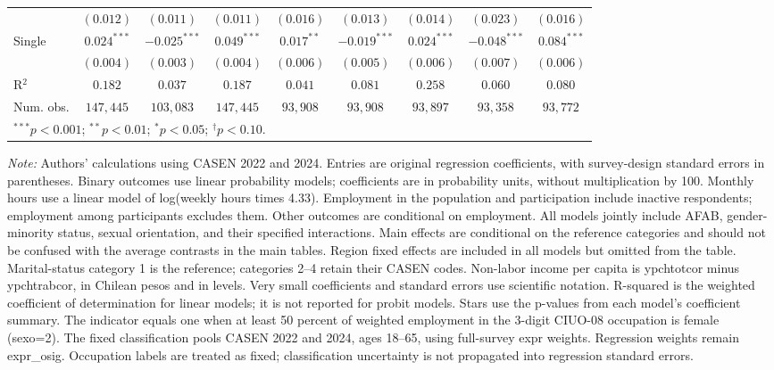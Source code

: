 \begin{table}[htpb]
{\begin{tabular}{l c c c c c c c c}
 & $(0.012)$ & $(0.011)$ & $(0.011)$ & $(0.016)$ & $(0.013)$ & $(0.014)$ & $(0.023)$ & $(0.016)$ \\
Single & $0.024^{***}$ & $-0.025^{***}$ & $0.049^{***}$ & $0.017^{**}$ & $-0.019^{***}$ & $0.024^{***}$ & $-0.048^{***}$ & $0.084^{***}$ \\
 & $(0.004)$ & $(0.003)$ & $(0.004)$ & $(0.006)$ & $(0.005)$ & $(0.006)$ & $(0.007)$ & $(0.006)$ \\
\hline
R$^2$ & $0.182$ & $0.037$ & $0.187$ & $0.041$ & $0.081$ & $0.258$ & $0.060$ & $0.080$ \\
Num. obs. & $147,445$ & $103,083$ & $147,445$ & $93,908$ & $93,908$ & $93,897$ & $93,358$ & $93,772$ \\
\hline
\multicolumn{9}{l}{\scriptsize $^{***}p<0.001$; $^{**}p<0.01$; $^{*}p<0.05$; $^{\dagger}p<0.10$.} \\
\end{tabular}%
}
\par\smallskip
\begin{minipage}{\textwidth}\footnotesize\raggedright
\textit{Note:} Authors' calculations using CASEN 2022 and 2024. Entries are original regression coefficients, with survey-design standard errors in parentheses. Binary outcomes use linear probability models; coefficients are in probability units, without multiplication by 100. Monthly hours use a linear model of log(weekly hours times 4.33). Employment in the population and participation include inactive respondents; employment among participants excludes them. Other outcomes are conditional on employment. All models jointly include AFAB, gender-minority status, sexual orientation, and their specified interactions. Main effects are conditional on the reference categories and should not be confused with the average contrasts in the main tables. Region fixed effects are included in all models but omitted from the table. Marital-status category 1 is the reference; categories 2--4 retain their CASEN codes. Non-labor income per capita is ypchtotcor minus ypchtrabcor, in Chilean pesos and in levels. Very small coefficients and standard errors use scientific notation. R-squared is the weighted coefficient of determination for linear models; it is not reported for probit models. Stars use the p-values from each model's coefficient summary. The indicator equals one when at least 50 percent of weighted employment in the 3-digit CIUO-08 occupation is female (sexo=2). The fixed classification pools CASEN 2022 and 2024, ages 18--65, using full-survey expr weights. Regression weights remain expr\_osig. Occupation labels are treated as fixed; classification uncertainty is not propagated into regression standard errors.
\end{minipage}
\end{table}

